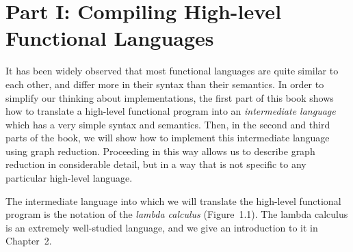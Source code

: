 \section{Part I: Compiling High-level Functional Languages}
It has been widely observed that most functional languages are quite similar to
each other, and differ more in their syntax than their semantics. In order to
simplify our thinking about implementations, the first part of this book shows
how to translate a high-level functional program into an \textit{intermediate language}
which has a very simple syntax and semantics. Then, in the second and third
parts of the book, we will show how to implement this intermediate language
using graph reduction. Proceeding in this way allows us to describe graph
reduction in considerable detail, but in a way that is not specific to any
particular high-level language.

The intermediate language into which we will translate the high-level
functional program is the notation of the \textit{lambda calculus} (Figure~1.1). The
lambda calculus is an extremely well-studied language, and we give an introduction
to it in Chapter~2.






